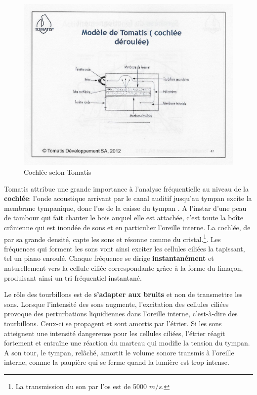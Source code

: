  \begin{figure}
	\centering
	\includegraphics[width=1.0\linewidth]{images/Cochleederoule_haut.jpg}
	\caption[Cochlée selon Tomatis]{Cochlée selon Tomatis}
	\label{fig:cochleederoulehaut}
      \end{figure}
      Tomatis attribue une grande importance à l'analyse
          fréquentielle au niveau de la\textbf{ cochlée}:
l'onde acoustique arrivant par le canal auditif
jusqu'au tympan  excite la membrane tympanique, donc l'os de la caisse
du tympan \autocite {tomatis_conf1972}.%
 A l'instar d'une
peau de tambour qui fait chanter le bois auquel elle est attachée,
c'est toute la boîte crânienne qui est inondée de sons et en particulier
l'oreille interne. La cochlée, de par sa grande densité, capte les sons
et résonne comme du cristal.\footnote{La transmission du son par l'os est de
5000 $m/s$.}.
Les fréquences qui forment les sons vont ainsi exciter les cellules
ciliées la tapissant, tel un piano enroulé.
Chaque fréquence se dirige \textbf{instantanément }et
naturellement vers la cellule ciliée correspondante grâce à la
forme du limaçon, produisant ainsi un tri fréquentiel
instantané.


Le rôle des tourbillons est de \textbf{s'adapter aux bruits}
et non de transmettre les sons.
Lorsque l'intensité des sons aug\-men\-te,
l'ex\-ci\-ta\-tion des cellules ciliées provoque des perturbations liquidiennes
dans l'oreille interne, c'est-à-dire des tourbillons. Ceux-ci se propagent
et sont amortis par l'étrier. Si les sons atteignent une intensité
dangereuse pour les cellules ciliées, l'étrier réagit fortement et
entraîne une réaction du marteau qui modifie la tension du tympan.
A son tour, le tympan, relâché, amortit le volume sonore transmis
à l'oreille interne, comme la paupière qui se ferme quand la lumière
est trop intense.


